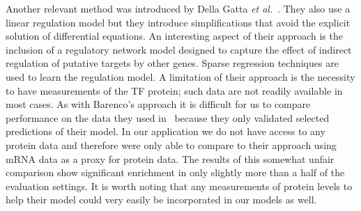 \documentclass{pnastwo}
\begin{document}
\begin{article}
Another relevant method was introduced by Della Gatta {\em et
  al.}~\cite{Gatta2008}. They also use a linear regulation model but
they introduce simplifications that avoid the explicit solution of
differential equations. An interesting aspect of their approach is the
inclusion of a regulatory network model designed to capture the effect
of indirect regulation of putative targets by other genes. Sparse regression
techniques are used to learn the regulation model. A limitation of
their approach is the necessity to have measurements of the TF
protein; such data are not readily available in most cases. As with
Barenco's approach it is difficult for us to compare performance on
the data they used in~\cite{Gatta2008} because they only validated
selected predictions of their model. In our application we do not have
access to any protein data and therefore were only able to compare to
their approach using mRNA data as a proxy for protein data.
The results of this somewhat unfair comparison show significant
enrichment in only slightly more than a half of the evaluation
settings.
It is worth noting that any measurements of protein levels to help
their model could very easily be incorporated in our models as well.


\end{article}
\end{document}
